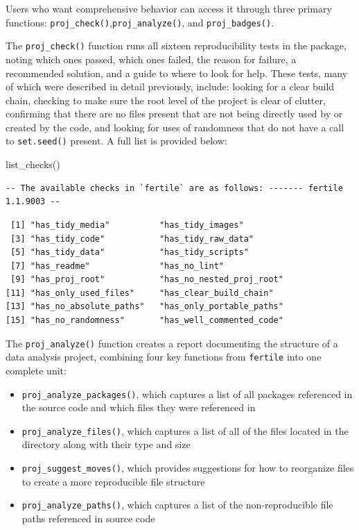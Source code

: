 \documentclass[12pt,twoside]{reedthesis}
\newenvironment{Shaded}{\begin{snugshade}}{\end{snugshade}}
\newcommand{\FunctionTok}[1]{\textcolor[rgb]{0.00,0.00,0.00}{#1}}
\newcommand{\NormalTok}[1]{#1}
\providecommand{\tightlist}{%
  \setlength{\itemsep}{0pt}\setlength{\parskip}{0pt}}
\begin{document}
Users who want comprehensive behavior can access it through three primary functions: \texttt{proj\_check()},\texttt{proj\_analyze()}, and \texttt{proj\_badges()}.

The \texttt{proj\_check()} function runs all sixteen reproducibility tests in the package, noting which ones passed, which ones failed, the reason for failure, a recommended solution, and a guide to where to look for help. These tests, many of which were described in detail previously, include: looking for a clear build chain, checking to make sure the root level of the project is clear of clutter, confirming that there are no files present that are not being directly used by or created by the code, and looking for uses of randomness that do not have a call to \texttt{set.seed()} present. A full list is provided below:
\begin{Shaded}
\begin{Highlighting}[]
\FunctionTok{list\_checks}\NormalTok{()}
\end{Highlighting}
\end{Shaded}
\begin{verbatim}
-- The available checks in `fertile` are as follows: ------- fertile 1.1.9003 --
\end{verbatim}
\begin{verbatim}
 [1] "has_tidy_media"          "has_tidy_images"        
 [3] "has_tidy_code"           "has_tidy_raw_data"      
 [5] "has_tidy_data"           "has_tidy_scripts"       
 [7] "has_readme"              "has_no_lint"            
 [9] "has_proj_root"           "has_no_nested_proj_root"
[11] "has_only_used_files"     "has_clear_build_chain"  
[13] "has_no_absolute_paths"   "has_only_portable_paths"
[15] "has_no_randomness"       "has_well_commented_code"
\end{verbatim}
The \texttt{proj\_analyze()} function creates a report documenting the structure of a data analysis project, combining four key functions from \texttt{fertile} into one complete unit:
\begin{itemize}
\tightlist
\item
  \texttt{proj\_analyze\_packages()}, which captures a list of all packages referenced in the source code and which files they were referenced in
\item
  \texttt{proj\_analyze\_files()}, which captures a list of all of the files located in the directory along with their type and size
\item
  \texttt{proj\_suggest\_moves()}, which provides suggestions for how to reorganize files to create a more reproducible file structure
\item
  \texttt{proj\_analyze\_paths()}, which captures a list of the non-reproducible file paths referenced in source code
\end{itemize}
\end{document}
